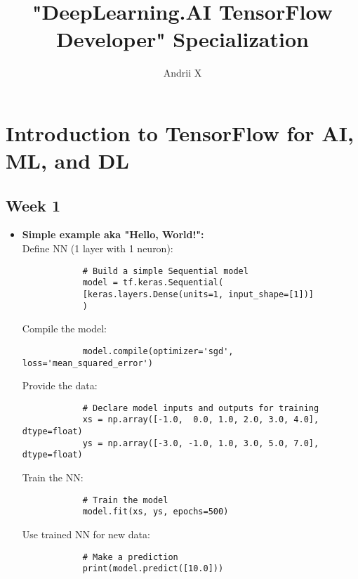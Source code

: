 \documentclass[20pt]{article}
\title{"DeepLearning.AI TensorFlow Developer" Specialization }
\author{ Andrii X }
\date{}
\begin{document}
	\maketitle
	
	\section{Introduction to TensorFlow for AI, ML, and DL}
	\subsection{Week 1}
	\begin{itemize}
		
		\item \textbf{Simple example aka "Hello, World!":}
		\\
		Define NN (1 layer with 1 neuron):
		\begin{verbatim}
			# Build a simple Sequential model
			model = tf.keras.Sequential(
			[keras.layers.Dense(units=1, input_shape=[1])]
			)
		\end{verbatim}
		Compile the model:
		\begin{verbatim}
			model.compile(optimizer='sgd', loss='mean_squared_error')
		\end{verbatim}
		Provide the data:
		\begin{verbatim}
			# Declare model inputs and outputs for training
			xs = np.array([-1.0,  0.0, 1.0, 2.0, 3.0, 4.0], dtype=float)
			ys = np.array([-3.0, -1.0, 1.0, 3.0, 5.0, 7.0], dtype=float)	
		\end{verbatim}
		Train the NN:
		\begin{verbatim}
			# Train the model
			model.fit(xs, ys, epochs=500)	
		\end{verbatim}
		Use trained NN for new data:
		\begin{verbatim}
			# Make a prediction
			print(model.predict([10.0]))	
		\end{verbatim}
	\end{itemize}
\end{document}
